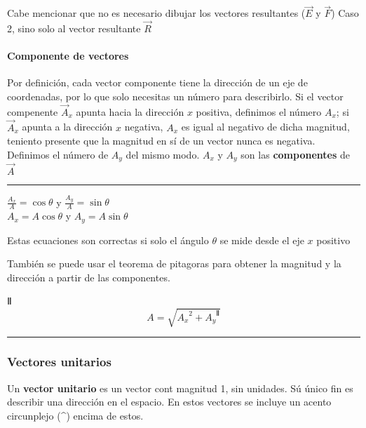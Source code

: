 \documentclass[
]{article}
\begin{document}
Cabe mencionar que no es necesario dibujar los vectores resultantes
({\(\overset{\rightarrow}{E}\)} y {\(\overset{\rightarrow}{F}\)}) Caso
2, sino solo al vector resultante {\(\overset{\rightarrow}{R}\)}

\hypertarget{componente-de-vectores}{%
\paragraph{Componente de vectores}\label{componente-de-vectores}}

Por definición, cada vector componente tiene la dirección de un eje de
coordenadas, por lo que solo necesitas un número para describirlo. Si el
vector compenente {\({\overset{\rightarrow}{A}}_{x}\)} apunta hacia la
dirección {\(x\)} positiva, definimos el número {\(A_{x}\)}; si
{\({\overset{\rightarrow}{A}}_{x}\)} apunta a la dirección {\(x\)}
negativa, {\(A_{x}\)} es igual al negativo de dicha magnitud, teniento
presente que la magnitud en sí de un vector nunca es negativa. Definimos
el número de {\(A_{y}\)} del mismo modo. {\(A_{x}\)} y {\(A_{y}\)} son
las \textbf{componentes} de {\(\overset{\rightarrow}{A}\)}

\begin{center}\rule{0.5\linewidth}{0.5pt}\end{center}

{\(\frac{A_{x}}{A} = \cos\theta\)} y
{\(\frac{A_{y}}{A} = \sin\theta\)}\\
{\(A_{x} = A\cos\theta\)} y {\(A_{y} = A\sin\theta\)}

Estas ecuaciones son correctas si solo el ángulo {\(\theta\)} se mide
desde el eje {\(x\)} positivo

También se puede usar el teorema de pitagoras para obtener la magnitud y
la dirección a partir de las componentes.

{Ⅱ\[A = \sqrt{{A_{x}}^{2} + {A_{y}}^{Ⅱ}}\]}

\begin{center}\rule{0.5\linewidth}{0.5pt}\end{center}

\hypertarget{vectores-unitarios}{%
\subsubsection{Vectores unitarios}\label{vectores-unitarios}}

Un \textbf{vector unitario} es un vector cont magnitud 1, sin unidades.
Sú único fin es describir una dirección en el espacio. En estos vectores
se incluye un acento circunplejo (\^{}) encima de estos.
\end{document}
